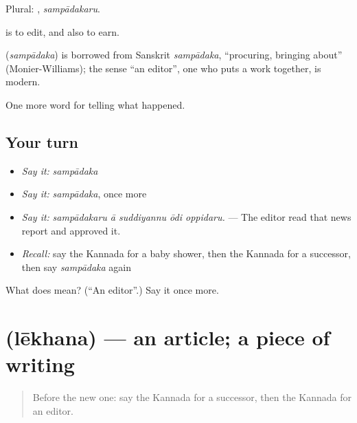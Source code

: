 Plural: , \emph{sampādakaru}.

 is to edit, and also to earn.

\begin{cousinweb}
\textbf{} (\emph{sampādaka}) is borrowed from Sanskrit \emph{sampādaka}, \textquotedblleft{}procuring, bringing about\textquotedblright{} (Monier-Williams); the sense \textquotedblleft{}an editor\textquotedblright{}, one who puts a work together, is modern.
\end{cousinweb}

\begin{grammarlens}[title={What you've built}]
One more word for telling what happened.
\end{grammarlens}

\subsection*{Your turn}
\begin{itemize}
\raggedright
  \item \emph{Say it:} \emph{sampādaka}
  \item \emph{Say it:} \emph{sampādaka}, once more
  \item \emph{Say it:} \emph{sampādakaru ā suddiyannu ōdi oppidaru.} — The editor read that news report and approved it.
  \item \emph{Recall:} say the Kannada for a baby shower, then the Kannada for a successor, then say \emph{sampādaka} again
\end{itemize}

\begin{tcolorbox}[breakable,colback=teal!4,colframe=teal!35!black,title={Before you move on}]
What does  mean? (\textquotedblleft{}An editor\textquotedblright{}.) Say it once more.
\end{tcolorbox}
\section[\texorpdfstring{\kn{ಲೇಖನ} (lēkhana)}{ಲೇಖನ (lēkhana)}]{ (lēkhana) — an article; a piece of writing}

\label{lesson:KA-C335-lekhana}



\begin{quote}
Before the new one: say the Kannada for a successor, then the Kannada for an editor.
\end{quote}

